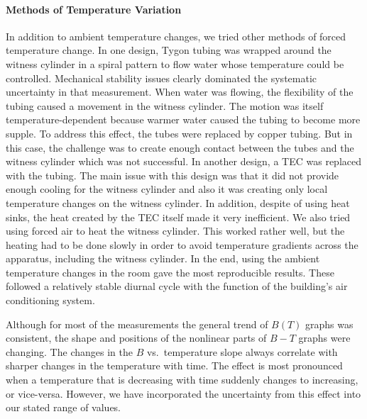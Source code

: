 \paragraph{Methods of Temperature Variation}

In addition to ambient temperature changes, we tried other methods of
forced temperature change.  In one design, Tygon tubing was wrapped
around the witness cylinder in a spiral pattern to flow water whose
temperature could be controlled.  Mechanical stability issues clearly
dominated the systematic uncertainty in that measurement.  When water
was flowing, the flexibility of the tubing caused a movement in the
witness cylinder.  The motion was itself temperature-dependent because
warmer water caused the tubing to become more supple.  To address this
effect, the tubes were replaced by copper tubing.  But in this case,
the challenge was to create enough contact between the tubes and the
witness cylinder which was not successful. In another design, a TEC
was replaced with the tubing. The main issue with this design was that
it did not provide enough cooling for the witness cylinder and also it
was creating only local temperature changes on the witness
cylinder. In addition, despite of using heat sinks, the heat created
by the TEC itself made it very inefficient.  We also tried using
forced air to heat the witness cylinder.  This worked rather well, but
the heating had to be done slowly in order to avoid temperature
gradients across the apparatus, including the witness cylinder.  In
the end, using the ambient temperature changes in the room gave the
most reproducible results.  These followed a relatively stable diurnal
cycle with the function of the building's air conditioning system.

Although for most of the measurements the general trend of $B(T)$
graphs was consistent, the shape and positions of the nonlinear parts
of $B-T$ graphs were changing.  The changes in the $B$ vs.~temperature
slope always correlate with sharper changes in the temperature with
time.  The effect is most pronounced when a temperature that is
decreasing with time suddenly changes to increasing, or vice-versa.
However, we have incorporated the uncertainty from this effect into
our stated range of values.





